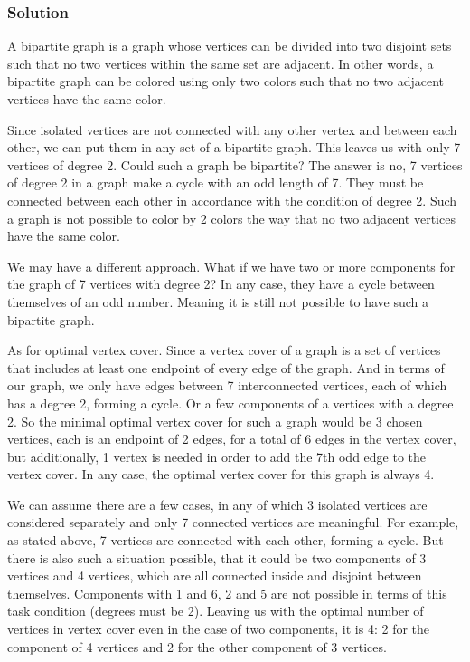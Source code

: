 \documentclass[a4paper]{article}
\begin{document}
\subsubsection*{Solution}
\par A bipartite graph is a graph whose vertices can be divided into two disjoint sets such that no two vertices within the same set are adjacent. In other words, a bipartite graph can be colored using only two colors such that no two adjacent vertices have the same color.\\ 
\par Since isolated vertices are not connected with any other vertex and between each other, we can put them in any set of a bipartite graph. This leaves us with only 7 vertices of degree 2. Could such a graph be bipartite? The answer is no, 7 vertices of degree 2 in a graph make a cycle with an odd length of 7. They must be connected between each other in accordance with the condition of degree 2. Such a graph is not possible to color by 2 colors the way that no two adjacent vertices have the same color. \\
\par We may have a different approach. What if we have two or more components for the graph of 7 vertices with degree 2? In any case, they have a cycle between themselves of an odd number. Meaning it is still not possible to have such a bipartite graph. \\
\par As for optimal vertex cover. Since a vertex cover of a graph is a set of vertices that includes at least one endpoint of every edge of the graph. And in terms of our graph, we only have edges between 7 interconnected vertices, each of which has a degree 2, forming a cycle. Or a few components of a vertices with a degree 2. So the minimal optimal vertex cover for such a graph would be 3 chosen vertices, each is an endpoint of 2 edges, for a total of 6 edges in the vertex cover, but additionally, 1 vertex is needed in order to add the 7th odd edge to the vertex cover. In any case, the optimal vertex cover for this graph is always 4. \\
\par We can assume there are a few cases, in any of which 3 isolated vertices are considered separately and only 7 connected vertices are meaningful. For example, as stated above, 7 vertices are connected with each other, forming a cycle. But there is also such a situation possible, that it could be two components of 3 vertices and 4 vertices, which are all connected inside and disjoint between themselves. Components with 1 and 6, 2 and 5 are not possible in terms of this task condition (degrees must be 2). Leaving us with the optimal number of vertices in vertex cover even in the case of two components, it is 4: 2 for the component of 4 vertices and 2 for the other component of 3 vertices.
\end{document}
